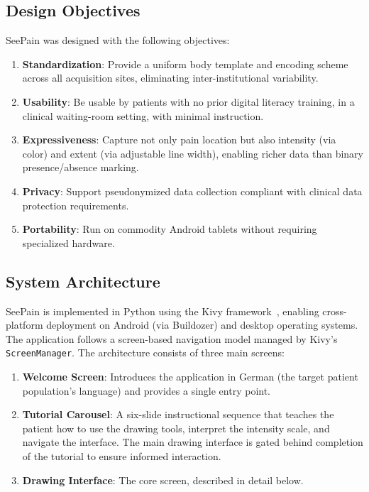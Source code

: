 \documentclass[conference]{IEEEtran}
\begin{document}
\subsection{Design Objectives}

SeePain was designed with the following objectives:
\begin{enumerate}
    \item \textbf{Standardization}: Provide a uniform body template and encoding scheme across all acquisition sites, eliminating inter-institutional variability.
    \item \textbf{Usability}: Be usable by patients with no prior digital literacy training, in a clinical waiting-room setting, with minimal instruction.
    \item \textbf{Expressiveness}: Capture not only pain location but also intensity (via color) and extent (via adjustable line width), enabling richer data than binary presence/absence marking.
    \item \textbf{Privacy}: Support pseudonymized data collection compliant with clinical data protection requirements.
    \item \textbf{Portability}: Run on commodity Android tablets without requiring specialized hardware.
\end{enumerate}

\subsection{System Architecture}

SeePain is implemented in Python using the Kivy framework~\cite{kivy}, enabling cross-platform deployment on Android (via Buildozer) and desktop operating systems. The application follows a screen-based navigation model managed by Kivy's \texttt{ScreenManager}. The architecture consists of three main screens:

\begin{enumerate}
    \item \textbf{Welcome Screen}: Introduces the application in German (the target patient population's language) and provides a single entry point.
    \item \textbf{Tutorial Carousel}: A six-slide instructional sequence that teaches the patient how to use the drawing tools, interpret the intensity scale, and navigate the interface. The main drawing interface is gated behind completion of the tutorial to ensure informed interaction.
    \item \textbf{Drawing Interface}: The core screen, described in detail below.
\end{enumerate}
\end{document}
